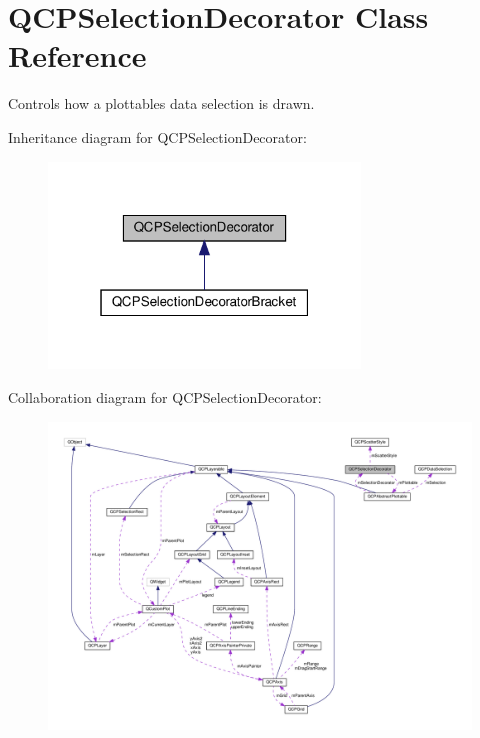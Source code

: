 \hypertarget{classQCPSelectionDecorator}{}\section{Q\+C\+P\+Selection\+Decorator Class Reference}
\label{classQCPSelectionDecorator}


Controls how a plottable\textquotesingle{}s data selection is drawn.  




Inheritance diagram for Q\+C\+P\+Selection\+Decorator\+:\nopagebreak
\begin{figure}[H]
\begin{center}
\leavevmode
\includegraphics[width=235pt]{classQCPSelectionDecorator__inherit__graph}
\end{center}
\end{figure}


Collaboration diagram for Q\+C\+P\+Selection\+Decorator\+:\nopagebreak
\begin{figure}[H]
\begin{center}
\leavevmode
\includegraphics[width=350pt]{classQCPSelectionDecorator__coll__graph}
\end{center}
\end{figure}
